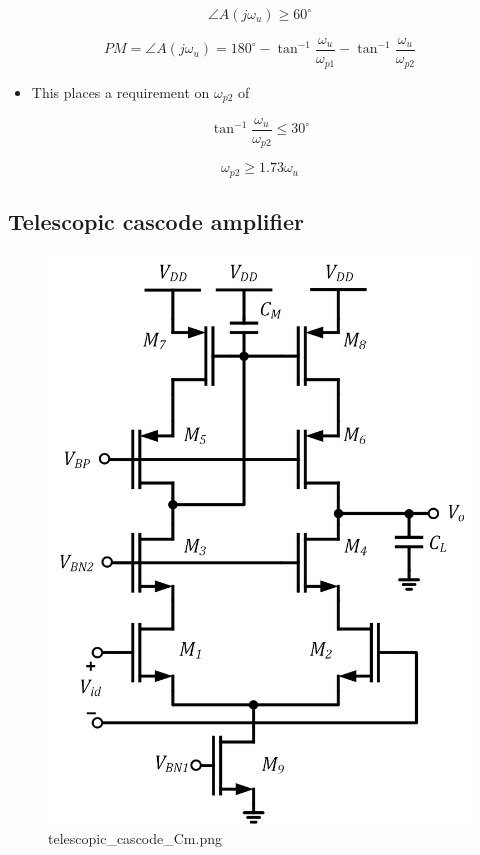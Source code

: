 \documentclass[11pt]{article}
\providecommand{\tightlist}{%
      \setlength{\itemsep}{0pt}\setlength{\parskip}{0pt}}
\begin{document}
\begin{equation}
\angle A(j\omega_u) \geq 60^{\circ}
\end{equation}

\begin{equation}
PM = \angle A(j\omega_u) = 180^{\circ} - \tan^{-1}\dfrac{\omega_u}{\omega_{p1}} - \tan^{-1}\dfrac{\omega_u}{\omega_{p2}}
\end{equation}

\begin{itemize}
\tightlist
\item
  This places a requirement on \(\omega_{p2}\) of
\end{itemize}

\begin{equation}
\tan^{-1}\dfrac{\omega_u}{\omega_{p2}} \leq 30^{\circ}
\end{equation}

\begin{equation}
\boxed{\omega_{p2} \geq 1.73\omega_u}
\end{equation}

    \hypertarget{telescopic-cascode-amplifier}{%
\subsection{Telescopic cascode
amplifier}\label{telescopic-cascode-amplifier}}

    \begin{figure}
\centering
\includegraphics{telescopic_cascode_Cm.png}
\caption{telescopic\_cascode\_Cm.png}
\end{figure}
\end{document}
